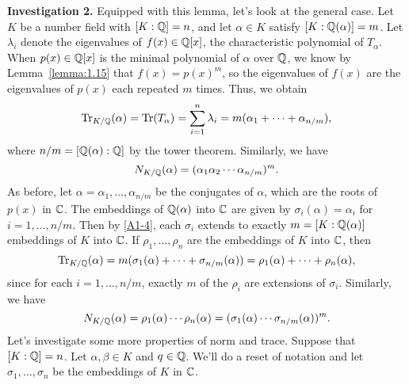 {\bf Investigation 2.} Equipped with this lemma, let's look at the general 
case. Let $K$ be a number field with $[K : \mathbb{Q}] = n$, and let $\alpha \in K$ 
satisfy $[K : \mathbb{Q}(\alpha)] = m$. Let $\lambda_i$ denote the eigenvalues of 
$f(x) \in \mathbb{Q}[x]$, the characteristic polynomial of $T_\alpha$. When 
$p(x) \in \mathbb{Q}[x]$ is the minimal polynomial of $\alpha$ over $\mathbb{Q}$, we know by 
Lemma~\ref{lemma:1.15} that $f(x) = p(x)^m$, so the eigenvalues of 
$f(x)$ are the eigenvalues of $p(x)$ each repeated $m$ times. Thus, 
we obtain 
\[ \operatorname{Tr}_{K/\mathbb{Q}}(\alpha) = \operatorname{Tr}(T_\alpha) = \sum_{i=1}^n \lambda_i = 
m(\alpha_1 + \cdots + \alpha_{n/m}), \] 
where $n/m = [\mathbb{Q}(\alpha) : \mathbb{Q}]$ by the tower theorem. Similarly, we have 
\[ N_{K/\mathbb{Q}}(\alpha) = (\alpha_1 \alpha_2 \cdots \alpha_{n/m})^m. \] 
As before, let $\alpha = \alpha_1, \dots, \alpha_{n/m}$ be the conjugates 
of $\alpha$, which are the roots of $p(x)$ in $\mathbb{C}$. 
The embeddings of $\mathbb{Q}(\alpha)$ into $\mathbb{C}$ are given by $\sigma_i(\alpha) 
= \alpha_i$ for $i = 1, \dots, n/m$. Then by \ref{A1-4}, each $\sigma_i$ 
extends to exactly $m = [K : \mathbb{Q}(\alpha)]$ embeddings of $K$ into $\mathbb{C}$. 
If $\rho_1, \dots, \rho_n$ are the embeddings of $K$ into $\mathbb{C}$, then 
\[ \operatorname{Tr}_{K/\mathbb{Q}}(\alpha) = m(\sigma_1(\alpha) + \cdots + \sigma_{n/m}(\alpha))
= \rho_1(\alpha) + \cdots + \rho_n(\alpha), \]
since for each $i = 1, \dots, n/m$, exactly $m$ of the $\rho_i$ are 
extensions of $\sigma_i$. Similarly, we have 
\[ N_{K/\mathbb{Q}}(\alpha) = \rho_1(\alpha) \cdots \rho_n(\alpha) = 
(\sigma_1(\alpha) \cdots \sigma_{n/m}(\alpha))^m. \] 
Let's investigate some more properties of norm and trace. Suppose that 
$[K : \mathbb{Q}] = n$. Let $\alpha, \beta \in K$ and $q \in \mathbb{Q}$. We'll do a reset 
of notation and let $\sigma_1, \dots, \sigma_n$ be the embeddings of $K$ 
in $\mathbb{C}$.
